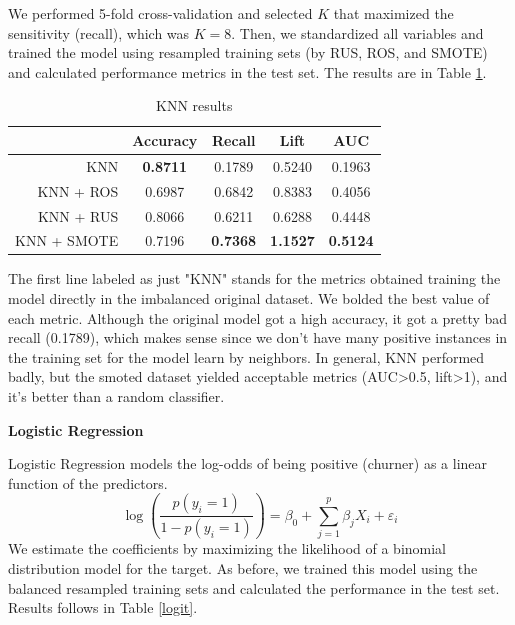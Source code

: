 \documentclass[12pt,letterpaper]{article}
\newcommand{\eps}{\varepsilon}
\begin{document}
	We performed 5-fold cross-validation and selected $K$ that maximized the sensitivity (recall), which was $K=8$. Then, we standardized all variables and trained the model using resampled training sets (by RUS, ROS, and SMOTE) and calculated performance metrics in the test set. The results are in Table \ref{knn}.
	
	\begin{table}[!htb]
		\centering
		\addtolength{\tabcolsep}{6pt}    
		\begin{tabular}{|r|cccc|}
			\hline
			& Accuracy & Recall & Lift & AUC \\ 
			\hline
			KNN  & \textbf{0.8711} & 0.1789 & 0.5240 & 0.1963 \\ 
			KNN + ROS & 0.6987 & 0.6842 & 0.8383 & 0.4056 \\ 
			KNN + RUS & 0.8066 & 0.6211 & 0.6288 & 0.4448 \\ 
			KNN + SMOTE & 0.7196 & \textbf{0.7368} & \textbf{1.1527} & \textbf{0.5124} \\ 
			\hline
		\end{tabular}
	\caption{KNN results}
	\label{knn}
	\end{table}

 The first line labeled as just "KNN" stands for the metrics obtained training the model directly in the imbalanced original dataset. We bolded the best value of each metric. Although the original model got a high accuracy, it got a pretty bad recall (0.1789), which makes sense since we don't have many positive instances in the training set for the model learn by neighbors. In general, KNN performed badly, but the smoted dataset yielded acceptable metrics (AUC>0.5, lift>1), and it's better than a random classifier.
 
 \textbf{Logistic Regression}
 
 Logistic Regression models the log-odds of being positive (churner) as a linear function of the predictors.
 $$\log\left(\dfrac{p(y_i=1)}{1-p(y_i=1)}\right)=\beta_0+\sum_{j=1}^{p}\beta_jX_i+\eps_i$$
 We estimate the coefficients by maximizing the likelihood of a binomial distribution model for the target.
 As before, we trained this model using the balanced resampled training sets and calculated the performance in the test set. Results follows in Table \ref{logit}.
 
\end{document}
